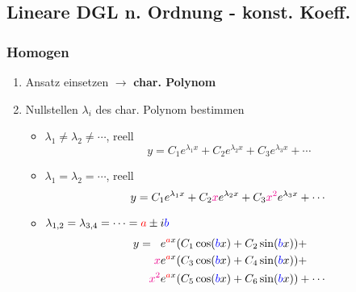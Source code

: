 \subsection{Lineare DGL n. Ordnung - konst. Koeff.}
    \subsubsection{Homogen}\label{sec:konst-koeff-homogen}
        \vspace{0.5em}
        \begin{enumerate}
            \item Ansatz  einsetzen $\to$ \textbf{char. Polynom}
            \item Nullstellen $\lambda_i$ des char. Polynom bestimmen
            \begin{itemize}
                \item $\lambda_1 \neq \lambda_2 \neq \cdots$, reell
                    $$
                        y = C_1 e^{\lambda_1 x} + C_2 e^{\lambda_2 x} + C_3 e^{\lambda_3 x}+ \cdots
                    $$
                \item $\lambda_1 = \lambda_2 = \cdots$, reell
                    $$
                        y = C_1 e^{\lambda_1 x} + C_2 {\color{magenta} x} e^{\lambda_2 x} + C_3 {\color{magenta} x^2} e^{\lambda_3 x} + \cdots
                    $$
                \item $\lambda_{1,2} = \lambda_{3,4} = \cdots = {\color{red}a} \pm i {\color{blue}b}$
                    \begin{align*}
                        y =\phantom{x} &e^{{\color{red}a}x} (C_1 \cos({\color{blue}b}x) + C_2 \sin({\color{blue}b}x)) +\\
                            {\color{magenta} x}&e^{{\color{red}a}x} (C_3 \cos({\color{blue}b}x) + C_4 \sin({\color{blue}b}x))+\\
                            {\color{magenta} x^2}&e^{{\color{red}a}x} (C_5 \cos({\color{blue}b}x) + C_6 \sin({\color{blue}b}x))+ \cdots
                    \end{align*}
            \end{itemize}
        \end{enumerate}
        \vspace{3pt}
